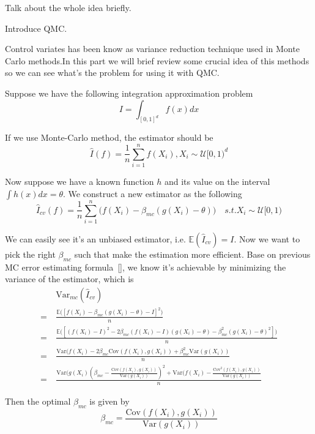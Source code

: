 


Talk about the whole idea briefly.


Introduce QMC.



Control variates has been know as variance reduction technique used in Monte Carlo methods.In this part we will brief review some crucial idea of this methods so we can see what's the problem for using it with QMC. 

Suppose we have the following integration approximation problem
\[I= \int_{[0,1]^d}f(x)dx\]

If we use Monte-Carlo method, the estimator should be 
\[
\hat{I}(f)=\frac{1}{n}\sum_{i=1}^{n}f(X_i), X_i\sim \mathcal{U}[0,1)^d
\]

Now suppose we have a known function $h$ and its value on the interval
$\int h(x)dx = \theta$. We construct a new estimator as the following 
\[ \hat{I}_{cv}(f)=\frac{1}{n}\sum_{i=1}^{n}\Big( f(X_i)-\beta_{mc}(g(X_i)-\theta) \Big) \quad s.t. X_i\sim \mathcal{U}[0,1)\]

We can easily see it's an unbiased estimator, i.e. $\mathbb{E}(\hat{I}_{cv}) = I$. Now we want to pick the right $\beta_{mc}$ such that make the estimation more efficient. Base on previous MC error estimating formula~\eqref{}, we know it's achievable by minimizing the variance of the estimator, which is 
\begin{align*}
	\quad &\mathrm{Var}_{mc}(\hat{I}_{cv}) \\
	=& \frac{\mathbb{E}\big([f(X_i)-\beta_{mc}(g(X_i)-\theta)-I]^2 \big)}{n} \\
	=& \frac{\mathbb{E}\big([(f(X_i)-I)^2-2\beta_{mc}(f(X_i)-I)(g(X_i)-\theta)-\beta_{mc}^2(g(X_i)-\theta)^2] \big)}{n}\\
	=& \frac{\mathrm{Var}(f(X_i)-2\beta_{mc}\mathrm{Cov}(f(X_i),g(X_i))+\beta_{mc}^2\mathrm{Var}(g(X_i)) }{n}\\
	=& \frac{\mathrm{Var}(g(X_i)(\beta_{mc}-\frac{\mathrm{Cov}(f(X_i),g(X_i))}{\mathrm{Var}(g(X_i))})^2+\mathrm{Var}(f(X_i)-\frac{\mathrm{Cov}^2(f(X_i),g(X_i))}{\mathrm{Var}(g(X_i))} }{n}
\end{align*}

Then the optimal $\beta_{mc}$ is given by 
\[
\beta_{mc}=\frac{\mathrm{Cov}(f(X_i),g(X_i))}{\mathrm{Var}(g(X_i))}
\]

